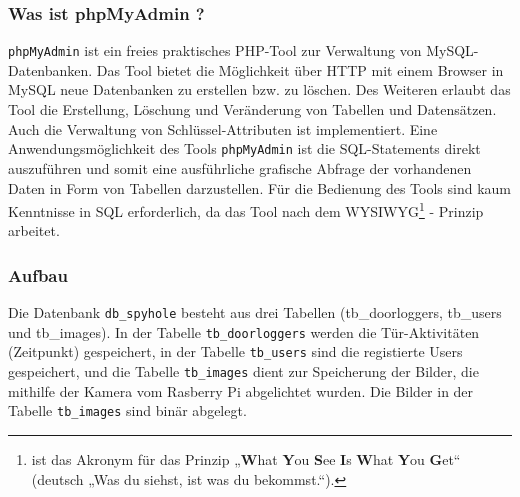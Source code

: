 \subsubsection{Was ist phpMyAdmin ?}
\texttt{phpMyAdmin} ist ein freies praktisches PHP-Tool zur Verwaltung von MySQL-Datenbanken. Das Tool bietet die Möglichkeit über HTTP mit einem Browser in MySQL neue Datenbanken zu erstellen bzw. zu löschen. Des Weiteren erlaubt das Tool die Erstellung, Löschung und Veränderung von Tabellen und Datensätzen. Auch die Verwaltung von Schlüssel-Attributen ist implementiert. Eine Anwendungsmöglichkeit des Tools \texttt{phpMyAdmin} ist die SQL-Statements direkt auszuführen und somit eine ausführliche grafische Abfrage der vorhandenen Daten in Form von Tabellen darzustellen. Für die Bedienung des Tools sind kaum Kenntnisse in SQL erforderlich, da das Tool nach dem WYSIWYG\footnote{ist das Akronym für das Prinzip „\textbf{W}hat \textbf{Y}ou \textbf{S}ee \textbf{I}s \textbf{W}hat \textbf{Y}ou \textbf{G}et“ (deutsch „Was du siehst, ist was du bekommst.“).} - Prinzip arbeitet.

\subsubsection{Aufbau}
				
Die Datenbank \texttt{db\_spyhole} besteht aus drei Tabellen (tb\_doorloggers, tb\_users und tb\_images). In der  Tabelle \texttt{tb\_doorloggers} werden die Tür-Aktivitäten (Zeitpunkt) gespeichert, in der Tabelle \texttt{tb\_users} sind die registierte Users gespeichert, und die Tabelle \texttt{tb\_images} dient zur Speicherung der Bilder, die mithilfe der Kamera vom Rasberry Pi abgelichtet wurden. Die Bilder in der Tabelle \texttt{tb\_images} sind binär abgelegt.  


